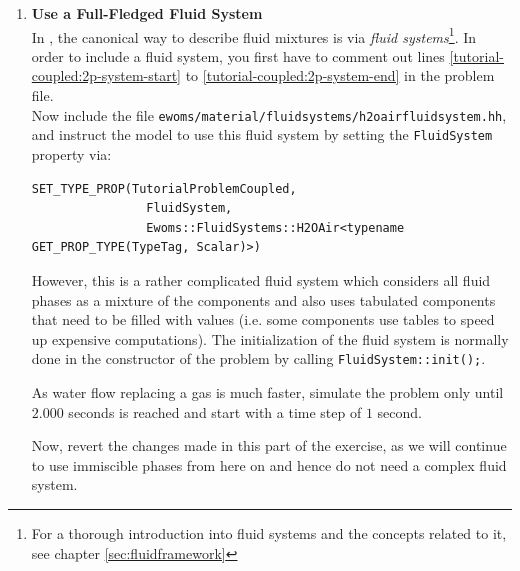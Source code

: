 \begin{enumerate}
\item \textbf{Use a Full-Fledged Fluid System} \\
  In \eWoms, the canonical way to describe fluid mixtures is via
  \textit{fluid systems}\footnote{For a thorough introduction into
    fluid systems and the concepts related to it, see chapter
    \ref{sec:fluidframework}}.  In order to include a fluid system,
  you first have to comment out lines
  \ref{tutorial-coupled:2p-system-start}
  to \ref{tutorial-coupled:2p-system-end} in the problem file.\\
  Now include the file
  \texttt{ewoms/material/fluidsystems/h2oairfluidsystem.hh}, and
  instruct the model to use this fluid system by setting
  the \texttt{FluidSystem} property via:\\
\begin{lstlisting}[style=eWomsCode]
  SET_TYPE_PROP(TutorialProblemCoupled, 
                FluidSystem,
                Ewoms::FluidSystems::H2OAir<typename GET_PROP_TYPE(TypeTag, Scalar)>)
\end{lstlisting}
However, this is a rather complicated fluid system which considers all
fluid phases as a mixture of the components and also uses tabulated
components that need to be filled with values (i.e. some components
use tables to speed up expensive computations).  The initialization of
the fluid system is normally done in the constructor of the problem by
calling \texttt{FluidSystem::init();}.

As water flow replacing a gas is much faster, simulate the problem
only until $2.000$ seconds is reached and start with a time step of
$1$ second.

Now, revert the changes made in this part of the exercise, as we will
continue to use immiscible phases from here on and hence do not need a
complex fluid system.


\end{enumerate}
